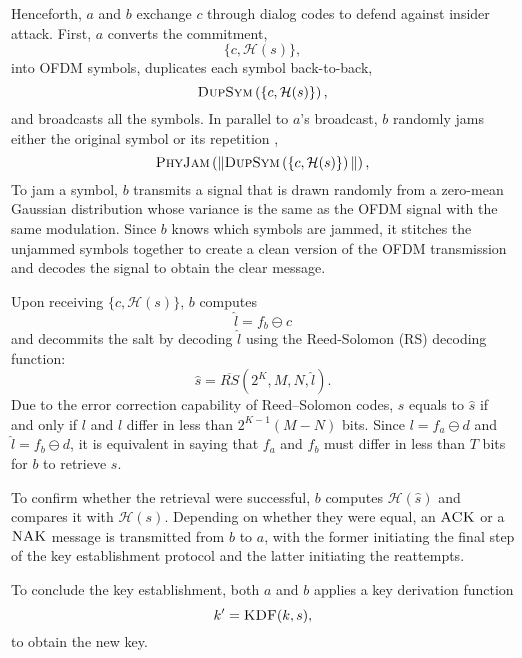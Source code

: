 Henceforth, $a$ and $b$ exchange $c$ through dialog codes to defend against insider attack. First, $a$ converts the commitment,
\[
\{c, \mathcal{H}(s)\},
\]
into OFDM symbols, duplicates each symbol back-to-back,
\[
\textsc{DupSym}\left(\{c, \mathcal{H}(s)\}\right),
\]
and broadcasts all the symbols. In parallel to $a$'s broadcast, $b$ randomly jams either the original symbol or its repetition \cite{GollakotaPhysicalLayerWireless2011,AroraDialogCodesSecure2009}, 
\[
\textsc{PhyJam}\left(\|\textsc{DupSym}\left(\{c, \mathcal{H}(s)\}\right)\|\right),
\]
To jam a symbol, $b$ transmits a signal that is drawn randomly from a zero-mean Gaussian distribution whose variance is the same as the OFDM signal with the same modulation. Since $b$ knows which symbols are jammed, it stitches the unjammed symbols together to create a clean version of the OFDM transmission and decodes the signal to obtain the clear message.

Upon receiving $\{c, \mathcal{H}(s)\}$, $b$ computes 
\[
\hat{l} = f_{b} \ominus c
\]
and decommits the salt by decoding $\hat{l}$ using the Reed-Solomon (RS) decoding function: 
\[
\hat{s} = \overline{RS}(2^K, M, N, \hat{l}).
\]
Due to the error correction capability of Reed–Solomon codes, $s$ equals to $ \hat{s}$ if and only if $l$ and $\hat{l}$ differ in less than $2^{K-1}(M-N)$ bits. Since $l = f_{a} \ominus d$ and $\hat{l} = f_{b} \ominus d$, it is equivalent in saying that $f_{a}$ and $f_{b}$ must differ in less than $T$ bits for $b$ to retrieve $s$.

To confirm whether the retrieval were successful, $b$ computes $\mathcal{H}(\hat{s})$ and compares it with $\mathcal{H}(s)$. Depending on whether they were equal, an $\textsc{ACK}$ or a $\textsc{NAK}$ message is transmitted from $b$ to $a$, with the former initiating the final step of the key establishment protocol and the latter initiating the reattempts.

To conclude the key establishment, both $a$ and $b$ applies a key derivation function 
\[
k' = \textsc{KDF}(k, s),
\]
to obtain the new key.

